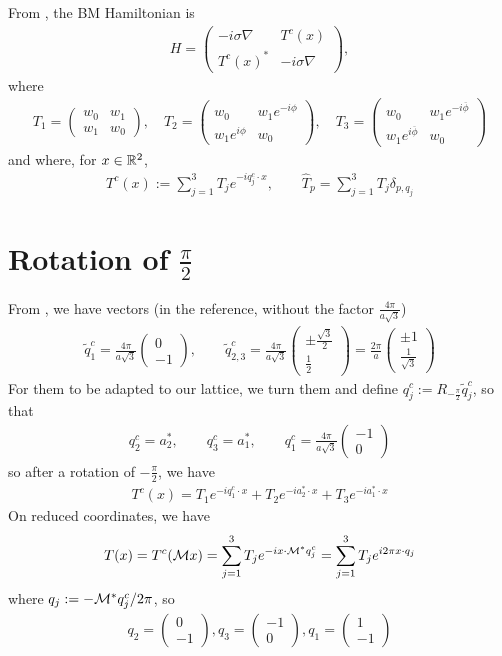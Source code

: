 \documentclass[11pt,a4paper,reqno,french,tikz]{amsart}
\newcommand{\na}{\nabla} %
\newcommand{\f}[2]{\frac{#1}{#2}} %
\newcommand{\mat}[1]{\begin{pmatrix} #1 \end{pmatrix}} %
\begin{document}
From \cite{BecEmbWitZwo21}, the BM Hamiltonian is
\begin{align*}
	H = \mat{-i\sigma \na & T^c(x) \\ T^c(x)^* & -i \sigma \na},
\end{align*}
where
\begin{align*}
\boxed{T_1 = \mat{w_0 & w_1 \\ w_1 & w_0}, \quad  T_2 = \mat{w_0 &  w_1e^{-i\phi} \\  w_1e^{i\phi} & w_0}, \quad T_3 = \mat{w_0 &  w_1e^{-i\overline{\phi}} \\  w_1e^{i\overline{\phi}} & w_0}}
\end{align*}
and where, for $x \in \mathbb{R}^2$,
\begin{align*}
T^c(x) := \sum_{j=1}^3 T_j e^{-iq^c_j \cdot x}, \qquad \widehat{T}_p = \sum_{j=1}^{3} T_j \delta_{p,q_j}
\end{align*}

\section{Rotation of $\f{\pi}2$}%
\label{sec:rotation_of_q_}

From \cite{BecEmbWitZwo21}, we have vectors (in the reference, without the factor $\f{4\pi}{a\sqrt 3}$)
\begin{align*}
	\widetilde{q}^c_1 = \f{4\pi}{a\sqrt 3} \mat{0 \\ -1}, \qquad \widetilde{q}^c_{2,3} =\f{4\pi}{a\sqrt 3} \mat{\pm \f{\sqrt{3}}2 \\ \f 12}  = \f{2\pi}a \mat{\pm 1 \\ \f{1}{\sqrt 3}}
\end{align*}
For them to be adapted to our lattice, we turn them and define $q^c_j := R_{-\f{\pi}2} \widetilde{q}^c_j$, so that
\begin{align*}
q^c_2 = a_2^*,\qquad q^c_3 = a_1^*,\qquad q^c_1 = \f{4\pi}{a\sqrt 3} \mat{-1 \\ 0}
\end{align*}
so after a rotation of $-\f{\pi}2$, we have
\begin{align*}
T^c(x) = T_1 e^{-i q_1^c \cdot x} + T_2 e^{-i a_2^* \cdot x} + T_3 e^{-i a_1^* \cdot x}
\end{align*}
On reduced coordinates, we have
\begin{align*}
T(x) = T^c(\mathcal{M} x) = \sum_{j=1}^3 T_j e^{-i x \cdot \mathcal{M}^* q^c_j} = \sum_{j=1}^3 T_j e^{i 2\pi x \cdot q_j}
\end{align*}
where $q_j :=  -\mathcal{M}^* q^c_j / 2\pi$, so
\begin{align*}
q_2 = \mat{0 \\ -1}, q_3 = \mat{-1 \\ 0}, q_1 = \mat{1 \\ -1}
\end{align*}
\end{document}

